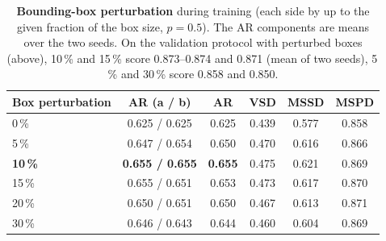 \begin{table}[h]
  \centering
  \setlength{\tabcolsep}{3.5pt}
  \footnotesize
  \begin{tabular}{lccccc}
    \toprule
    Box perturbation & AR (a / b) & AR & VSD & MSSD & MSPD \\
    \midrule
    0\,\% & 0.625 / 0.625 & 0.625 & 0.439 & 0.577 & 0.858 \\
    5\,\% & 0.647 / 0.654 & 0.650 & 0.470 & 0.616 & 0.866 \\
    \textbf{10\,\%} & \textbf{0.655 / 0.655} & \textbf{0.655} & 0.475 & 0.621 & 0.869 \\
    15\,\% & 0.655 / 0.651 & 0.653 & 0.473 & 0.617 & 0.870 \\
    20\,\% & 0.650 / 0.651 & 0.650 & 0.467 & 0.613 & 0.871 \\
    30\,\% & 0.646 / 0.643 & 0.644 & 0.460 & 0.604 & 0.869 \\
    \bottomrule
  \end{tabular}
  \caption{\textbf{Bounding-box perturbation} during training (each side by up to the given
  fraction of the box size, $p = 0.5$). The AR components are means over the two seeds. On the
  validation protocol with perturbed boxes (above), 10\,\% and 15\,\% score 0.873--0.874 and
  0.871 (mean of two seeds), 5\,\% and 30\,\% score 0.858 and 0.850.}
  \label{tab:supp:bbox}
\end{table}

